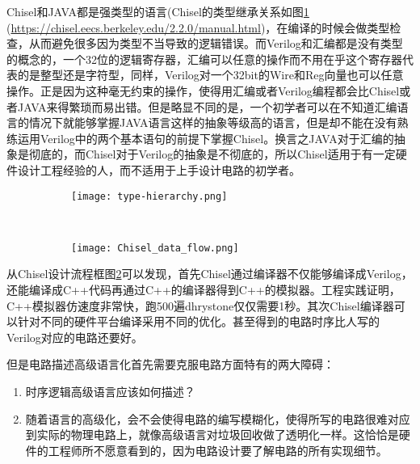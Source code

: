 Chisel和JAVA都是强类型的语言(Chisel的类型继承关系如图\ref{fig:type} (\url{https://chisel.eecs.berkeley.edu/2.2.0/manual.html})，在编译的时候会做类型检查，从而避免很多因为类型不当导致的逻辑错误。而Verilog和汇编都是没有类型的概念的，一个32位的逻辑寄存器，汇编可以任意的操作而不用在乎这个寄存器代表的是整型还是字符型，同样，Verilog对一个32bit的Wire和Reg向量也可以任意操作。正是因为这种毫无约束的操作，使得用汇编或者Verilog编程都会比Chisel或者JAVA来得繁琐而易出错。但是略显不同的是，一个初学者可以在不知道汇编语言的情况下就能够掌握JAVA语言这样的抽象等级高的语言，但是却不能在没有熟练运用Verilog中的两个基本语句的前提下掌握Chisel。换言之JAVA对于汇编的抽象是彻底的，而Chisel对于Verilog的抽象是不彻底的，所以Chisel适用于有一定硬件设计工程经验的人，而不适用于上手设计电路的初学者。
\begin{figure}[!htbp]
	\centering
	\begin{subfigure}[b]{0.35\textwidth}
		\texttt{[image: type-hierarchy.png]}
		\caption{}
		\label{fig:type}
	\end{subfigure}%
	~%
	\begin{subfigure}[b]{0.65\textwidth}
		\texttt{[image: Chisel\_data\_flow.png]}
		\caption{}
		\label{fig:design_flow}
	\end{subfigure}
	\label{fig:chisel_into}
\end{figure}

从Chisel设计流程框图\ref{fig:design_flow}可以发现，首先Chisel通过编译器不仅能够编译成Verilog，还能编译成C++代码再通过C++的编译器得到C++的模拟器。工程实践证明，C++模拟器仿速度非常快，跑500遍dhrystone仅仅需要1秒。其次Chisel编译器可以针对不同的硬件平台编译采用不同的优化。甚至得到的电路时序比人写的Verilog对应的电路还要好。

但是电路描述高级语言化首先需要克服电路方面特有的两大障碍：
\begin{enumerate}[label=(\arabic*)]
	\item 时序逻辑高级语言应该如何描述？
	\item 随着语言的高级化，会不会使得电路的编写模糊化，使得所写的电路很难对应到实际的物理电路上，就像高级语言对垃圾回收做了透明化一样。这恰恰是硬件的工程师所不愿意看到的，因为电路设计要了解电路的所有实现细节。
\end{enumerate}

